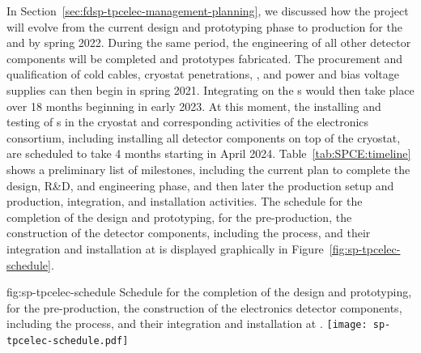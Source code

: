 In Section~\ref{sec:fdsp-tpcelec-management-planning}, we  
discussed how the project will evolve from the current design
and prototyping phase to production for the 
and  by spring 2022. During the same  
period, the engineering of all other detector components will
be completed and prototypes fabricated. The procurement
and qualification of cold cables, cryostat penetrations, ,
and power and bias voltage supplies can then begin in spring 2021.
Integrating  on the s would then
take place over 18 months beginning in early 2023. At
this moment, the installing and testing of s in 
the cryostat and corresponding activities of the  electronics consortium, including installing all 
detector components on top of the cryostat, are scheduled to
take 4 months starting in April 2024. Table~\ref{tab:SPCE:timeline} shows a preliminary list of 
milestones, including the current plan to complete  
the design, R\&D, and engineering phase, and then later  
the production setup and production, integration,
and installation activities. The schedule for the 
completion of the design and prototyping, for the pre-production,
the construction of the detector components, including the
 process, and their integration and installation at
 is displayed graphically in Figure~\ref{fig:sp-tpcelec-schedule}.


\begin{dunefigure}
{fig:sp-tpcelec-schedule}
{Schedule for the completion of the design and prototyping, for the pre-production,
the construction of the  electronics detector components, including the
 process, and their integration and installation at .}
\texttt{[image: sp-tpcelec-schedule.pdf]}
\end{dunefigure}

